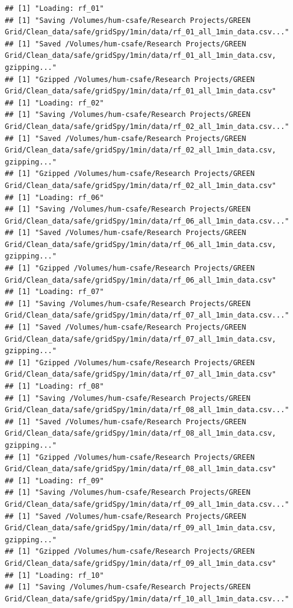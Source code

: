 \documentclass[]{article}
\begin{document}
\begin{verbatim}
## [1] "Loading: rf_01"
## [1] "Saving /Volumes/hum-csafe/Research Projects/GREEN Grid/Clean_data/safe/gridSpy/1min/data/rf_01_all_1min_data.csv..."
## [1] "Saved /Volumes/hum-csafe/Research Projects/GREEN Grid/Clean_data/safe/gridSpy/1min/data/rf_01_all_1min_data.csv, gzipping..."
## [1] "Gzipped /Volumes/hum-csafe/Research Projects/GREEN Grid/Clean_data/safe/gridSpy/1min/data/rf_01_all_1min_data.csv"
## [1] "Loading: rf_02"
## [1] "Saving /Volumes/hum-csafe/Research Projects/GREEN Grid/Clean_data/safe/gridSpy/1min/data/rf_02_all_1min_data.csv..."
## [1] "Saved /Volumes/hum-csafe/Research Projects/GREEN Grid/Clean_data/safe/gridSpy/1min/data/rf_02_all_1min_data.csv, gzipping..."
## [1] "Gzipped /Volumes/hum-csafe/Research Projects/GREEN Grid/Clean_data/safe/gridSpy/1min/data/rf_02_all_1min_data.csv"
## [1] "Loading: rf_06"
## [1] "Saving /Volumes/hum-csafe/Research Projects/GREEN Grid/Clean_data/safe/gridSpy/1min/data/rf_06_all_1min_data.csv..."
## [1] "Saved /Volumes/hum-csafe/Research Projects/GREEN Grid/Clean_data/safe/gridSpy/1min/data/rf_06_all_1min_data.csv, gzipping..."
## [1] "Gzipped /Volumes/hum-csafe/Research Projects/GREEN Grid/Clean_data/safe/gridSpy/1min/data/rf_06_all_1min_data.csv"
## [1] "Loading: rf_07"
## [1] "Saving /Volumes/hum-csafe/Research Projects/GREEN Grid/Clean_data/safe/gridSpy/1min/data/rf_07_all_1min_data.csv..."
## [1] "Saved /Volumes/hum-csafe/Research Projects/GREEN Grid/Clean_data/safe/gridSpy/1min/data/rf_07_all_1min_data.csv, gzipping..."
## [1] "Gzipped /Volumes/hum-csafe/Research Projects/GREEN Grid/Clean_data/safe/gridSpy/1min/data/rf_07_all_1min_data.csv"
## [1] "Loading: rf_08"
## [1] "Saving /Volumes/hum-csafe/Research Projects/GREEN Grid/Clean_data/safe/gridSpy/1min/data/rf_08_all_1min_data.csv..."
## [1] "Saved /Volumes/hum-csafe/Research Projects/GREEN Grid/Clean_data/safe/gridSpy/1min/data/rf_08_all_1min_data.csv, gzipping..."
## [1] "Gzipped /Volumes/hum-csafe/Research Projects/GREEN Grid/Clean_data/safe/gridSpy/1min/data/rf_08_all_1min_data.csv"
## [1] "Loading: rf_09"
## [1] "Saving /Volumes/hum-csafe/Research Projects/GREEN Grid/Clean_data/safe/gridSpy/1min/data/rf_09_all_1min_data.csv..."
## [1] "Saved /Volumes/hum-csafe/Research Projects/GREEN Grid/Clean_data/safe/gridSpy/1min/data/rf_09_all_1min_data.csv, gzipping..."
## [1] "Gzipped /Volumes/hum-csafe/Research Projects/GREEN Grid/Clean_data/safe/gridSpy/1min/data/rf_09_all_1min_data.csv"
## [1] "Loading: rf_10"
## [1] "Saving /Volumes/hum-csafe/Research Projects/GREEN Grid/Clean_data/safe/gridSpy/1min/data/rf_10_all_1min_data.csv..."

\end{verbatim}
\end{document}
